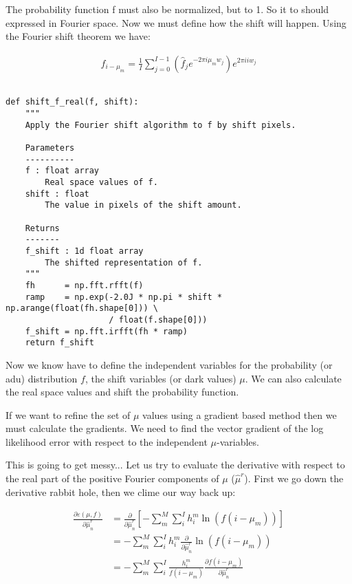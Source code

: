 \documentclass[11pt]{article}
\begin{document}
The probability function f must also be normalized, but to 1. So it to should expressed in Fourier space. Now we must define how the shift will happen. Using the Fourier shift theorem we have:

\begin{align}
f_{i - \mu_m} = \frac{1}{I} \sum_{j=0}^{I-1} (\hat{f}_j e^{-2\pi i \mu_m w_j}) e^{2\pi i i w_j}
\end{align}

\begin{verbatim}

def shift_f_real(f, shift):
    """
    Apply the Fourier shift algorithm to f by shift pixels.
    
    Parameters
    ----------
    f : float array
        Real space values of f.
    shift : float
        The value in pixels of the shift amount.
            
    Returns
    -------
    f_shift : 1d float array
        The shifted representation of f.
    """
    fh      = np.fft.rfft(f)
    ramp    = np.exp(-2.0J * np.pi * shift * np.arange(float(fh.shape[0])) \
                     / float(f.shape[0]))
    f_shift = np.fft.irfft(fh * ramp)
    return f_shift

\end{verbatim}

Now we know have to define the independent variables for the probability (or adu) distribution $f$, the shift variables (or dark values) $\mu$. We can also calculate the real space values and shift the probability function. 

If we want to refine the set of $\mu$ values using a gradient based method then we must calculate the gradients. We need to find the vector gradient of the log likelihood error with respect to the independent $\mu$-variables. 

This is going to get messy... Let us try to evaluate the derivative with respect to the real part of the positive Fourier components of $\mu$ ($\hat{\mu}^r$). First we go down the derivative rabbit hole, then we clime our way back up: 

\begin{align}
   \frac{\partial \varepsilon(\mu, f)}{\partial \hat{\mu}^r_n} &= \frac{\partial}{\partial \hat{\mu}^r_n}\left[-\sum_m^M \sum_i^I h^m_i \ln(f(i - \mu_m))\right] \\
   &=  -\sum_m^M \sum_i^I h^m_i \frac{\partial}{\partial \hat{\mu}^r_n} \ln(f(i - \mu_m)) \\
   &=  -\sum_m^M \sum_i^I \frac{h^m_i}{f(i - \mu_m)} \frac{\partial f(i - \mu_m)}{\partial \hat{\mu}^r_n}
\end{align}
\end{document}
